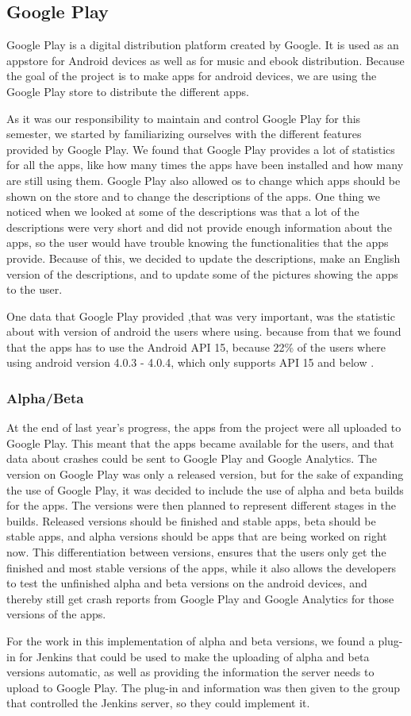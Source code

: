 \subsection{Google Play}
Google Play is a digital distribution platform created by Google. It is used as an appstore for Android devices as well as for music and ebook distribution. Because the goal of the project is to make apps for android devices, we are using the Google Play store to distribute the different apps. \citep{GooglePlay}

As it was our responsibility to maintain and control Google Play for this semester, we started by familiarizing ourselves with the different features provided by Google Play. We found that Google Play provides a lot of statistics for all the apps, like how many times the apps have been installed and how many are still using them. Google Play also allowed os to change which apps should be shown on the store and to change the descriptions of the apps. One thing we noticed when we looked at some of the descriptions was that a lot of the descriptions were very short and did not provide enough information about the apps, so the user would have trouble knowing the functionalities that the apps provide. Because of this, we decided to update the descriptions, make an English version of the descriptions, and to update some of the pictures showing the apps to the user.

One data that Google Play provided ,that was very important, was the statistic about with version of android the users where using. because from that we found that the apps has to use the Android API 15, because 22\% of the users where using android version 4.0.3 - 4.0.4, which only supports API 15 and below \citep{API15}. 

\subsubsection{Alpha/Beta}
At the end of last year’s progress, the apps from the project were all uploaded to Google Play. This meant that the apps became available for the users, and that data about crashes could be sent to Google Play and Google Analytics. The version on Google Play was only a released version, but for the sake of expanding the use of Google Play, it was decided to include the use of alpha and beta builds for the apps. The versions were then planned to represent different stages in the builds. Released versions should be finished and stable apps, beta should be stable apps, and alpha versions should be apps that are being worked on right now. This differentiation between versions, ensures that the users only get the finished and most stable versions of the apps, while it also allows the developers to test the unfinished alpha and beta versions on the android devices, and thereby still get crash reports from Google Play and Google Analytics for those versions of the apps.

For the work in this implementation of alpha and beta versions, we found a plug-in for Jenkins that could be used to make the uploading of alpha and beta versions automatic, as well as providing the information the server needs to upload to Google Play. The plug-in and information was then given to the group that controlled the Jenkins server, so they could implement it. 